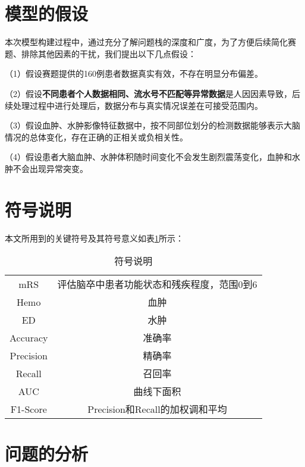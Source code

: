 \documentclass[bwprint]{gmcmthesis}
\begin{document}
	\section{模型的假设}
		本次模型构建过程中，通过充分了解问题栈的深度和广度，为了方便后续简化赛题、排除其他因素的干扰，我们提出以下几点假设：\par
		（1）假设赛题提供的160例患者数据真实有效，不存在明显分布偏差。\par
		（2）假设\textbf{不同患者个人数据相同、流水号不匹配等异常数据}是人因因素导致，后续处理过程中进行处理后，数据分布与真实情况误差在可接受范围内。\par
		（3）假设血肿、水肿影像特征数据中，按不同部位划分的检测数据能够表示大脑情况的总体变化，存在正确的正相关或负相关性。\par
		（4）假设患者大脑血肿、水肿体积随时间变化不会发生剧烈震荡变化，血肿和水肿不会出现异常突变。\par
	
	
	
	\section{符号说明}
	
		本文所用到的关键符号及其符号意义如表\ref{tab:means}所示： 
		
		\begin{table}[H]
			\caption{符号说明}
			\label{tab:means}
			\begin{tabular}{cc}
				\toprule[1.5pt]
				\makebox[0.4\textwidth][c]{符号} & \makebox[0.5\textwidth][c]{符号意义} \\
				\midrule[1pt]
				mRS & 评估脑卒中患者功能状态和残疾程度，范围0到6\\
				Hemo & 血肿\\
				ED & 水肿\\
				Accuracy & 准确率 \\
				Precision & 精确率\\
				Recall & 召回率\\
				AUC & 曲线下面积 \\
				F1-Score & Precision和Recall的加权调和平均 \\
				\bottomrule[1.5pt]
			\end{tabular}			
		\end{table}
	
	
	\section{问题的分析}
\end{document}
